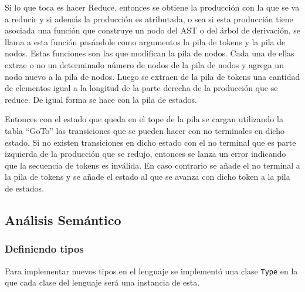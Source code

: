 Si lo que toca es hacer Reduce, entonces se obtiene la producci\'on con la que se va a reducir y si adem\'as la producci\'on es atributada, o sea si esta producci\'on tiene asociada una funci\'on que construye un nodo del AST o del \'arbol de derivaci\'on, se llama a esta funci\'on pas\'andole como argumentos la pila de tokens y la pila de nodos. Estas funciones son las que modifican la pila de nodos. Cada una de ellas extrae o no un determinado n\'umero de nodos de la pila de nodos y agrega un nodo nuevo a la pila de nodos. Luego se extraen de la pila de tokens una cantidad de elementos igual a la longitud de la parte derecha de la producci\'on que se reduce. De igual forma se hace con la pila de estados. 

Entonces con el estado que queda en el tope de la pila se cargan utilizando la tabla ``GoTo'' las transiciones que se pueden hacer con no terminales en dicho estado. Si no existen transiciones en dicho estado con el no terminal que es parte izquierda de la producci\'on que se redujo, entonces se lanza un error indicando que la secuencia de tokens es inv\'alida. En caso contrario se a\~{n}ade el no terminal a la pila de tokens y se a\~{n}ade el estado al que se avanza con dicho token a la pila de estados.

\subsection{An\'alisis Sem\'antico}
\subsubsection{Definiendo tipos}
Para implementar nuevos tipos en el lenguaje se implement\'o una clase \verb|Type| en la que cada clase del lenguaje ser\'a una instancia de esta.
 
